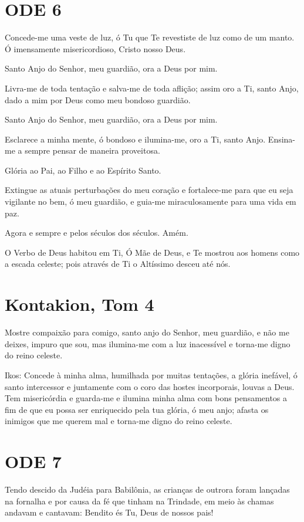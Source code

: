 \documentclass{subfiles}
\begin{document}
\section{ODE 6}

\eirmos{}Concede-me uma veste de luz, ó Tu que Te revestiste de luz como de
um manto. Ó imensamente misericordioso, Cristo nosso Deus.

Santo Anjo do Senhor, meu guardião, ora a Deus por mim.

Livra-me de toda tentação e salva-me de toda aflição; assim oro a Ti,
santo Anjo, dado a mim por Deus como meu bondoso guardião.

Santo Anjo do Senhor, meu guardião, ora a Deus por mim.

Esclarece a minha mente, ó bondoso e ilumina-me, oro a Ti, santo
Anjo. Ensina-me a sempre pensar de maneira proveitosa.

Glória ao Pai, ao Filho e ao Espírito Santo.

Extingue as atuais perturbações do meu coração e fortalece-me para
que eu seja vigilante no bem, ó meu guardião, e guia-me miraculosamente
para uma vida em paz.

Agora e sempre e pelos séculos dos séculos. Amém.

O Verbo de Deus habitou em Ti, Ó Mãe de Deus, e Te mostrou aos
homens como a escada celeste; pois através de Ti o Altíssimo desceu até nós.

\section{Kontakion, Tom 4}

Mostre compaixão para comigo, santo anjo do Senhor, meu
guardião, e não me deixes, impuro que sou, mas ilumina-me com a luz
inacessível e torna-me digno do reino celeste.

Ikos: Concede à minha alma, humilhada por muitas tentações, a glória inefável,
ó santo intercessor e juntamente com o coro das hostes incorporais, louvas a
Deus. Tem misericórdia e guarda-me e ilumina minha alma com bons
pensamentos a fim de que eu possa ser enriquecido pela tua glória, ó meu
anjo; afasta os inimigos que me querem mal e torna-me digno do reino celeste.

\section{ODE 7}

\eirmos{}Tendo descido da Judéia para Babilônia, as crianças de outrora foram
lançadas na fornalha e por causa da fé que tinham na Trindade, em meio às
chamas andavam e cantavam: Bendito és Tu, Deus de nossos pais!
\end{document}
